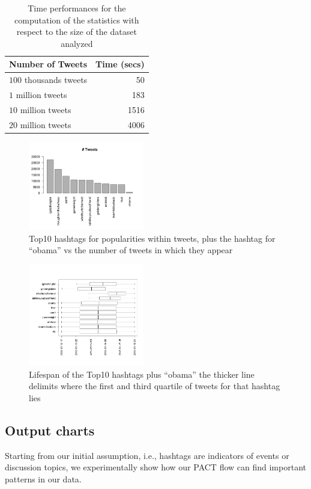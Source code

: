 \begin{table}[htb]
\centering 
\begin{tabular}{|l|r|}
\hline		
Number of Tweets			& Time (secs)\\
\hline
$100$ thousands tweets		&	50\\
$1$ million tweets		& 183\\
$10$ million tweets 		& 1516\\
$20$ million tweets 		& 4006\\  
\hline
\end{tabular}
\caption{Time performances for the computation of the statistics with respect to the size of the dataset analyzed}
\label{tbl:times}
\end{table}

\begin{figure}[!ht]
\includegraphics[width=0.45\textwidth]{images/hashtag-tweets-hist_20.png} 
\caption{Top10 hashtags for popularities within tweets, plus the hashtag for ``obama'' vs the number of tweets in which they appear}
\label{fig:tweets-hist}
\end{figure}

\begin{figure}[!hb]
\includegraphics[width=0.45\textwidth]{images/hashtags-timewindow.png} 
\caption{Lifespan of the Top10 hashtags plus ``obama'' the thicker line delimits where the first and third quartile of tweets for that hashtag lies}
\label{fig:tweets-lifespan}
\end{figure}

\subsection{Output charts}
Starting from our initial assumption, i.e., hashtags  are indicators of events or discussion topics, we experimentally show how our PACT flow can find important patterns in our data.

